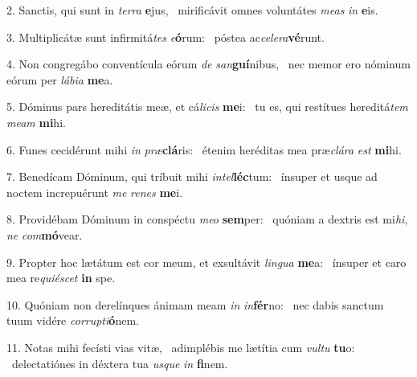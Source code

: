 2. Sanctis, qui sunt in \textit{ter}\textit{ra} \textbf{e}jus, \ast\  mirificávit omnes voluntátes \textit{me}\textit{as} \textit{in} \textbf{e}is.\

3. Multiplicátæ sunt infirmitá\textit{tes} \textit{e}\textbf{ó}rum: \ast\  póstea ac\textit{ce}\textit{le}\textit{ra}\textbf{vé}runt.\

4. Non congregábo conventícula eórum \textit{de} \textit{san}\textbf{guí}nibus, \ast\  nec memor ero nóminum eórum per \textit{lá}\textit{bi}\textit{a} \textbf{me}a.\

5. Dóminus pars hereditátis meæ, et cá\textit{li}\textit{cis} \textbf{me}i: \ast\  tu es, qui restítues hereditá\textit{tem} \textit{me}\textit{am} \textbf{mi}hi.\

6. Funes cecidérunt mihi \textit{in} \textit{præ}\textbf{clá}ris: \ast\  étenim heréditas mea præ\textit{clá}\textit{ra} \textit{est} \textbf{mi}hi.\

7. Benedícam Dóminum, qui tríbuit mihi \textit{in}\textit{tel}\textbf{léc}tum: \ast\  ínsuper et usque ad noctem increpuérunt \textit{me} \textit{re}\textit{nes} \textbf{me}i.\

8. Providébam Dóminum in conspéctu \textit{me}\textit{o} \textbf{sem}per: \ast\  quóniam a dextris est mi\textit{hi}, \textit{ne} \textit{com}\textbf{mó}vear.\

9. Propter hoc lætátum est cor meum, et exsultávit \textit{lin}\textit{gua} \textbf{me}a: \ast\  ínsuper et caro mea re\textit{qui}\textit{é}\textit{scet} \textbf{in} spe.\

10. Quóniam non derelínques ánimam meam \textit{in} \textit{in}\textbf{fér}no: \ast\  nec dabis sanctum tuum vidére \textit{cor}\textit{rup}\textit{ti}\textbf{ó}nem.\

11. Notas mihi fecísti vias vitæ, \dag\  adimplébis me lætítia cum \textit{vul}\textit{tu} \textbf{tu}o: \ast\  delectatiónes in déxtera tua \textit{us}\textit{que} \textit{in} \textbf{fi}nem.\

